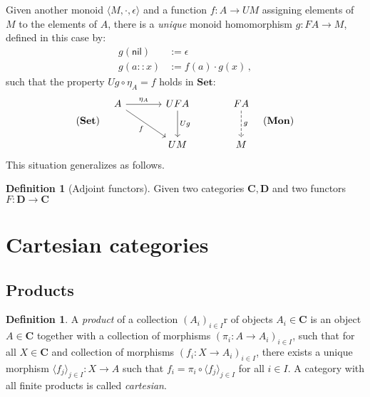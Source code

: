 \documentclass[draft,11pt]{report}
\theoremstyle{definition}
\newtheorem{definition}[theorem]{Definition}
\newcommand{\kw}[1]{\ensuremath{ \mathsf{#1} }}
\begin{document}
Given another monoid $\langle M, {\cdot}, \epsilon \rangle$ and
a function $f : A \rightarrow U M$
assigning elements of $M$
to the elements of $A$,
there is a \emph{unique} monoid homomorphism
$g : F A \rightarrow M$,
defined in this case by:
\begin{align*}
  g(\kw{nil}) &:= \epsilon \\
  g(a :: x) &:= f(a) \cdot g(x)
  \,,
\end{align*}
such that the property
$U g \circ \eta_A = f$
holds in $\mathbf{Set}$:
\[
  (\mathbf{Set})
  \quad
  \begin{tikzcd}[sep=large]
    A \ar[r, "\eta_A"] \ar[dr, "f"'] &
    UF A \ar[d, "U g"] &
    F A \ar[d, dashed, "g"] \\
    & U M & M
  \end{tikzcd}
  \quad
  (\mathbf{Mon})
\]
This situation generalizes as follows.

\begin{definition}[Adjoint functors]
Given two categories $\mathbf{C}, \mathbf{D}$
and two functors $F : \mathbf{D} \rightarrow \mathbf{C}$
\end{definition}



\section{Cartesian categories} %

\subsection{Products} %

\begin{definition} \label{def:prod}
A \emph{product} of a collection $(A_i)_{i \in I}$r
of objects $A_i \in \mathbf{C}$
is an object $A \in \mathbf{C}$
together with a collection of morphisms
$(\pi_i : A \rightarrow A_i)_{i \in I}$,
such that for all $X \in \mathbf{C}$ and collection of morphisms
$(f_i : X \rightarrow A_i)_{i \in I}$,
there exists a unique morphism
$\langle f_j \rangle_{j \in I} : X \rightarrow A$
such that
$f_i = \pi_i \circ \langle f_j \rangle_{j \in I}$
for all $i \in I$.
A category with all finite products is called \emph{cartesian}.
\end{definition}
\end{document}
